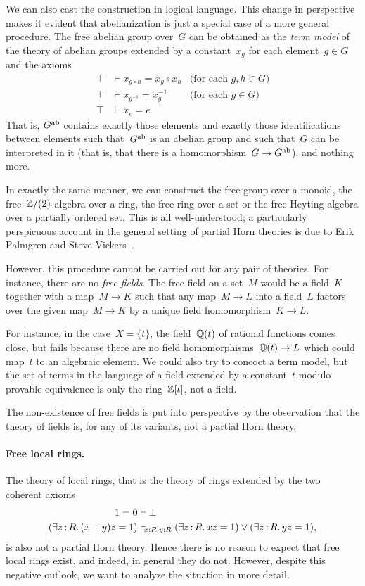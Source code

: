 \documentclass{ws-rv9x6}
\begin{document}
{We can also cast the construction in logical language. This change in perspective makes it evident
that abelianization is just a special case of a more general procedure.
The free abelian group over~$G$ can be obtained as the \emph{term model} of the
theory of abelian groups extended by a constant~$x_g$ for each element~$g \in
G$ and the axioms
\begin{align*}
  \top &\vdash x_{g \circ h} = x_g \circ x_h & \text{(for each~$g,h \in G$)} \\
  \top &\vdash x_{g^{-1}} = x_g^{-1} & \text{(for each~$g \in G$)} \\
  \top &\vdash x_e = e
\end{align*}
That is, $G^{\mathrm{ab}}$ contains exactly those elements and exactly those
identifications between elements such that~$G^{\mathrm{ab}}$ is an abelian group and such
that~$G$ can be interpreted in it (that is, that there is a homomorphism~$G \to
G^{\mathrm{ab}}$), and nothing more.

In exactly the same manner, we can construct the free group over a monoid, the
free~$\mathbb{Z}/(2)$-algebra over a ring, the free ring over a set or the free
Heyting algebra over a partially ordered set. This is all well-understood; a
particularly perspicuous account in the general setting of partial Horn
theories is due to Erik Palmgren and Steve Vickers~\cite[Section~5]{palmgren-vickers:partial-horn}.

However, this procedure cannot be carried out for any pair of theories. For
instance, there are no \emph{free fields}. The free field on a set~$M$ would be
a field~$K$ together with a map~$M \to K$ such that any map~$M \to L$ into a field~$L$ factors
over the given map~$M \to K$ by a unique field homomorphism~$K \to L$.

For instance, in the case~$X = \{ t \}$, the field~$\mathbb{Q}(t)$ of rational
functions comes close, but fails because there are no field homomorphisms~$\mathbb{Q}(t)
\to L$ which could map~$t$ to an algebraic element. We could also try to
concoct a term model, but the set of terms in the language of a field extended
by a constant~$t$ modulo provable equivalence is only the ring~$\mathbb{Z}[t]$, not a
field.

The non-existence of free fields is put into perspective by the observation that the
theory of fields is, for any of its variants, not a partial Horn theory.

\paragraph{Free local rings.} The theory of local rings, that is the theory of
rings extended by the two coherent axioms
\begin{align*}
  1 = 0 &\vdash \bot \\
  (\exists z\,{:}\,R\mathpunct{.} (x+y)z = 1) &\mathrel{\vdash\!\!\!_{x:R,y:R}} (\exists z\,{:}\,R\mathpunct{.} xz = 1) \vee
  (\exists z\,{:}\,R\mathpunct{.} yz = 1),
\end{align*}
is also not a partial Horn theory. Hence there is no reason to expect that free
local rings exist, and indeed, in general they do not. However, despite this
negative outlook, we want to analyze the situation in more detail.

}
\end{document}
